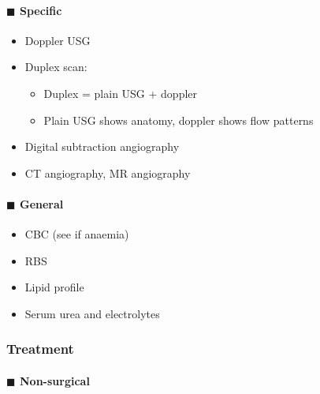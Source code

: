 \documentclass[
  14pt,
]{extarticle}
\providecommand{\tightlist}{%
  \setlength{\itemsep}{0pt}\setlength{\parskip}{0pt}}
\begin{document}
\hypertarget{blacksquare-specific}{%
\paragraph{\texorpdfstring{\(\blacksquare\)
Specific}{\textbackslash blacksquare Specific}}\label{blacksquare-specific}}

\begin{itemize}
\tightlist
\item
  Doppler USG
\item
  Duplex scan:

  \begin{itemize}
  \tightlist
  \item
    Duplex = plain USG + doppler
  \item
    Plain USG shows anatomy, doppler shows flow patterns
  \end{itemize}
\item
  Digital subtraction angiography
\item
  CT angiography, MR angiography
\end{itemize}

\hypertarget{blacksquare-general}{%
\paragraph{\texorpdfstring{\(\blacksquare\)
General}{\textbackslash blacksquare General}}\label{blacksquare-general}}

\begin{itemize}
\tightlist
\item
  CBC (see if anaemia)
\item
  RBS
\item
  Lipid profile
\item
  Serum urea and electrolytes
\end{itemize}

\hypertarget{treatment-3}{%
\subsubsection{Treatment}\label{treatment-3}}

\hypertarget{blacksquare-non-surgical}{%
\paragraph{\texorpdfstring{\(\blacksquare\)
Non-surgical}{\textbackslash blacksquare Non-surgical}}\label{blacksquare-non-surgical}}
\end{document}
